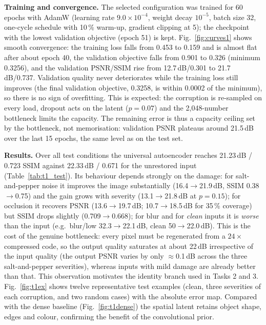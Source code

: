 

\textbf{Training and convergence.} The selected configuration was trained for 60 epochs with AdamW (learning rate $9.0\times10^{-4}$, weight decay $10^{-5}$, batch size 32, one-cycle schedule with 10\,\% warm-up, gradient clipping at 5); the checkpoint with the lowest validation objective (epoch 51) is kept. Fig.~\ref{fig:curves1} shows smooth convergence: the training loss falls from 0.453 to 0.159 and is almost flat after about epoch 40, the validation objective falls from 0.901 to 0.326 (minimum 0.3256), and the validation PSNR/SSIM rise from 12.7\,dB/0.301 to 21.7\,dB/0.737. Validation quality never deteriorates while the training loss still improves (the final validation objective, 0.3258, is within 0.0002 of the minimum), so there is no sign of overfitting. This is expected: the corruption is re-sampled on every load, dropout acts on the latent ($p=0.07$) and the 2{,}048-number bottleneck limits the capacity. The remaining error is thus a capacity ceiling set by the bottleneck, not memorisation: validation PSNR plateaus around 21.5\,dB over the last 15 epochs, the same level as on the test set.

\textbf{Results.} Over all test conditions the universal autoencoder reaches 21.23\,dB / 0.723 SSIM against 22.33\,dB / 0.671 for the unrestored input (Table~\ref{tab:t1_test}). Its behaviour depends strongly on the damage: for salt-and-pepper noise it improves the image substantially (16.4$\to$21.9\,dB, SSIM 0.38$\to$0.75) and the gain grows with severity (13.1$\to$21.8\,dB at $p=0.15$); for occlusion it recovers PSNR (13.6$\to$19.7\,dB; 10.7$\to$18.5\,dB for 35\,\% coverage) but SSIM drops slightly (0.709$\to$0.668); for blur and for \emph{clean} inputs it is \emph{worse} than the input (e.g.\ blur/low 32.3$\to$22.1\,dB, clean 50$\to$22.0\,dB). This is the cost of the genuine bottleneck: every pixel must be regenerated from a $24\times$ compressed code, so the output quality saturates at about 22\,dB irrespective of the input quality (the output PSNR varies by only $\approx$0.1\,dB across the three salt-and-pepper severities), whereas inputs with mild damage are already better than that. This observation motivates the identity branch used in Tasks 2 and 3. Fig.~\ref{fig:t1ex} shows twelve representative test examples (clean, three severities of each corruption, and two random cases) with the absolute error map. Compared with the dense baseline (Fig.~\ref{fig:t1dense}) the spatial latent retains object shape, edges and colour, confirming the benefit of the convolutional prior.

